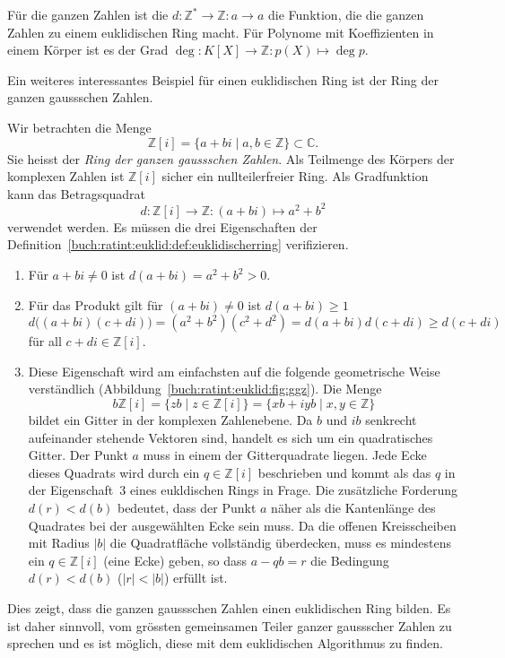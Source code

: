 Für die ganzen Zahlen ist die $d\colon\mathbb{Z}^*\to\mathbb{Z}: a\to a$
die Funktion, die die ganzen Zahlen zu einem euklidischen Ring macht.
Für Polynome mit Koeffizienten in einem Körper ist es der Grad
$\deg\colon K[X] \to \mathbb{Z} : p(X) \mapsto \deg p$.

Ein weiteres interessantes Beispiel für einen euklidischen Ring ist
der Ring der ganzen gaussschen Zahlen.

\begin{beispiel}
Wir betrachten die Menge
\[
\mathbb{Z}[i]
=
\{a+bi\mid a,b\in\mathbb{Z}\}\subset\mathbb{C}.
\]
Sie heisst der \emph{Ring der ganzen gaussschen Zahlen}.
%
%
Als Teilmenge des Körpers der komplexen Zahlen ist $\mathbb{Z}[i]$
sicher ein nullteilerfreier Ring.
Als Gradfunktion kann das Betragsquadrat 
\[
d
\colon
\mathbb{Z}[i] \to \mathbb{Z}
:
(a+bi) \mapsto a^2+b^2
\]
verwendet werden.
Es müssen die drei Eigenschaften der 
Definition~\ref{buch:ratint:euklid:def:euklidischerring}
verifizieren.
\begin{enumerate}
\item
Für $a+bi\ne 0$ ist $d(a+bi)=a^2+b^2>0$.
\item
Für das Produkt gilt für $(a+bi)\ne 0$ ist $d(a+bi)\ge 1$
\[
d\bigl(
(a+bi)(c+di)
\bigr)
=
(a^2+b^2)(c^2+d^2)
=
d(a+bi)d(c+di)
\ge
d(c+di)
\]
für all $c+di\in \mathbb{Z}[i]$.
\item
Diese Eigenschaft wird am einfachsten auf die folgende geometrische
Weise verständlich (Abbildung~\ref{buch:ratint:euklid:fig:ggz}).
%
Die Menge 
\[
b\mathbb{Z}[i]
=
\{ zb\mid z \in \mathbb{Z}[i] \}
=
\{ xb + iyb \mid x,y\in \mathbb{Z}
\}
\]
bildet ein Gitter in der komplexen Zahlenebene.
Da $b$ und $ib$ senkrecht aufeinander stehende Vektoren sind, 
handelt es sich um ein quadratisches Gitter.
Der Punkt $a$ muss in einem der Gitterquadrate liegen.
Jede Ecke dieses Quadrats wird durch ein $q\in\mathbb{Z}[i]$
beschrieben und kommt als das $q$ in der Eigenschaft~3 eines eukldischen
Rings in Frage.
Die zusätzliche Forderung $d(r)<d(b)$ bedeutet, dass der Punkt $a$
näher als die Kantenlänge des Quadrates bei der ausgewählten Ecke
sein muss.
Da die offenen Kreisscheiben mit Radius $|b|$ die Quadratfläche 
vollständig überdecken, muss es mindestens ein $q\in\mathbb{Z}[i]$
(eine Ecke) geben,
so dass $a-qb=r$ die Bedingung $d(r) < d(b)$ ($|r|<|b|$) erfüllt ist.
\end{enumerate}
Dies zeigt, dass die ganzen gaussschen Zahlen einen euklidischen
Ring bilden.
Es ist daher sinnvoll, vom grössten gemeinsamen Teiler ganzer
gaussscher Zahlen zu sprechen und es ist möglich, diese mit dem
euklidischen Algorithmus zu finden.
\end{beispiel}


